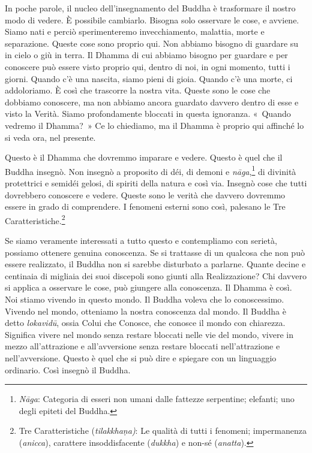 In poche parole, il nucleo dell'insegnamento del Buddha è trasformare il
nostro modo di vedere. È possibile cambiarlo. Bisogna solo osservare le
cose, e avviene. Siamo nati e perciò sperimenteremo invecchiamento,
malattia, morte e separazione. Queste cose sono proprio qui. Non abbiamo
bisogno di guardare su in cielo o giù in terra. Il Dhamma di cui abbiamo
bisogno per guardare e per conoscere può essere visto proprio qui,
dentro di noi, in ogni momento, tutti i giorni. Quando c'è una nascita,
siamo pieni di gioia. Quando c'è una morte, ci addoloriamo. È così che
trascorre la nostra vita. Queste sono le cose che dobbiamo conoscere, ma
non abbiamo ancora guardato davvero dentro di esse e visto la Verità.
Siamo profondamente bloccati in questa ignoranza. «~Quando vedremo il
Dhamma?~» Ce lo chiediamo, ma il Dhamma è proprio qui affinché lo si
veda ora, nel presente.

Questo è il Dhamma che dovremmo imparare e vedere. Questo è quel che il
Buddha insegnò. Non insegnò a proposito di déi, di demoni e
\emph{nāga},\footnote{\emph{Nāga}: Categoria di esseri non umani dalle
  fattezze serpentine; elefanti; uno degli epiteti del Buddha.} di
divinità protettrici e semidéi gelosi, di spiriti della natura e così
via. Insegnò cose che tutti dovrebbero conoscere e vedere. Queste sono
le verità che davvero dovremmo essere in grado di comprendere. I
fenomeni esterni sono così, palesano le Tre Caratteristiche.\footnote{Tre
  Caratteristiche (\emph{tilakkhaṇa)}: Le qualità di tutti i fenomeni;
  impermanenza (\emph{anicca}), carattere insoddisfacente
  (\emph{dukkha}) e non-sé (\emph{anatta}).}

Se siamo veramente interessati a tutto questo e contempliamo con
serietà, possiamo ottenere genuina conoscenza. Se si trattasse di un
qualcosa che non può essere realizzato, il Buddha non si sarebbe
disturbato a parlarne. Quante decine e centinaia di migliaia dei suoi
discepoli sono giunti alla Realizzazione? Chi davvero si applica a
osservare le cose, può giungere alla conoscenza. Il Dhamma è così. Noi
stiamo vivendo in questo mondo. Il Buddha voleva che lo conoscessimo.
Vivendo nel mondo, otteniamo la nostra conoscenza dal mondo. Il Buddha è
detto \emph{lokavidū}, ossia Colui che Conosce, che conosce il mondo con
chiarezza. Significa vivere nel mondo senza restare bloccati nelle vie
del mondo, vivere in mezzo all'attrazione e all'avversione senza restare
bloccati nell'attrazione e nell'avversione. Questo è quel che si può
dire e spiegare con un linguaggio ordinario. Così insegnò il Buddha.


